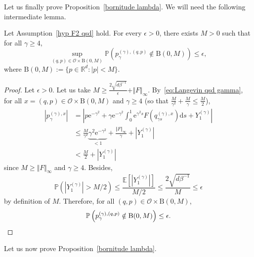 \documentclass[preprint,EJP]{ejpecp}
\begin{document}
Let us finally prove Proposition~\ref{bornitude lambda}. We will need the following intermediate lemma.
\begin{lemma}\label{tension vitesse lemme} Let Assumption~\ref{hyp F2 qsd} hold.
 For every $\epsilon>0$, there exists $M>0$ such that for all $\gamma\geq4$,
\begin{equation}\label{majoration}
    \sup_{(q,p)\in\mathcal{O}\times\mathrm{B}(0,M)}\mathbb{P}\left(p^{(\gamma),(q,p)}_\gamma\notin\mathrm{B}(0,M)\right)\leq\epsilon,
\end{equation} 
where $\mathrm{B}(0,M):=\{p\in\mathbb{R}^d:\vert p\vert<M\}$.
 \end{lemma}
\begin{proof}
 Let $\epsilon>0$. Let us take $M\geq \frac{2 \sqrt{d\beta^{-1}}}{\epsilon}+\Vert F\Vert_\infty$. By~\eqref{eq:Langevin qsd gamma}, for all $x=(q,p)\in\mathcal{O}\times\mathrm{B}(0,M)$ and $\gamma\geq4$ (so that $\frac{M}{\gamma^2}+\frac{M}{\gamma}\leq\frac{M}{2}$),  
\begin{align*}
    \left\vert p^{(\gamma),x}_{\gamma}\right\vert&=\left\vert p \mathrm{e}^{-\gamma^2}+\gamma \mathrm{e}^{-\gamma^2}\int_0^1\mathrm{e}^{\gamma^2 s} F(q^{(\gamma),x}_{\gamma s}) \mathrm{d}s+Y_1^{(\gamma)}\right\vert\\
    &\leq \frac{M}{\gamma^2} \underbrace{\gamma^2 \mathrm{e}^{-\gamma^2}}_{<1}+\frac{\Vert F\Vert_\infty}{\gamma}+\left\vert Y_1^{(\gamma)}\right\vert\\
    &< \frac{M}{2}+\left\vert Y_1^{(\gamma)}\right\vert
\end{align*}
since $M\geq\Vert F\Vert_\infty$ and $\gamma\geq4$. Besides, 
$$\mathbb{P}\left(\left\vert Y_1^{(\gamma)}\right\vert> M/2\right)\leq\frac{\mathbb{E}\left[\left\vert Y_1^{(\gamma)}\right\vert\right]}{M/2}\leq\frac{2  \sqrt{d\beta^{-1}}}{M}\leq\epsilon$$ by definition of $M$. Therefore, for all $(q,p)\in\mathcal{O}\times\mathrm{B}(0,M)$,
\begin{equation*}
  \mathbb{P}\left(p^{(\gamma),(q,p)}_\gamma\notin\mathrm{B}(0,M)\right)\leq\epsilon.\qedhere
\end{equation*}
\end{proof}
Let us now prove Proposition~\ref{bornitude lambda}.
\end{document}
